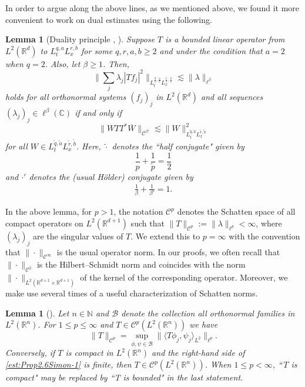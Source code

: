 \documentclass[a4paper]{amsart}
\numberwithin{equation}{section}%
\theoremstyle{plain}%
\newtheorem{lemma}[theorem]{Lemma}
\theoremstyle{definition}
\theoremstyle{remark}%
\def\C{\mathcal{C}}
\def\C{\mathcal{C}}
\newcommand{\R}{{\mathbb R}}
\newcommand{\N}{{\mathbb N}}
\begin{document}
In order to argue along the above lines, as we mentioned above, we found it more convenient to work on dual estimates using the following. 
\begin{lemma}[Duality principle \cite{FS_AJM}, \cite{BHLNS}]\label{l:duality}
Suppose $T$ is a bounded linear operator from $L^2(\mathbb{R}^d)$ to $L_t^{q,a} L_x^{r,b}$ for some $q,r,a,b \geq2$ and under the condition that $a = 2$ when $q = 2$. Also, let $\beta\geq1$.  Then, 
\[
\bigg\|\sum_j\lambda_j|Tf_j|^2 \bigg\|_{L_t^{\frac {q}{2},\frac {a}{2}}L_x^{\frac {r}{2},\frac{b}{2}}}\lesssim\|\lambda\|_{\ell^{\beta}}
\]
holds for all orthonormal systems $(f_j)_j$ in $L^2(\mathbb R^d)$ and all sequences $(\lambda_j)_j \in \ell^{\beta}(\mathbb C)$ if and only if 
\[
\|WTT^*\overline{W}\|_{\C^{\beta'}}
\lesssim 
\|W\|_{L_t^{\widetilde{q},\widetilde{a}}L_x^{\widetilde{r},\widetilde{b}}}^2
\]
for all $W\in L_t^{\widetilde{q},\widetilde{a}}L_x^{\widetilde{r},\widetilde{b}}$. Here, $\widetilde{\cdot}$ denotes the ``half conjugate" given by
\[
\frac{1}{p}+\frac{1}{\widetilde{p}}=\frac12
\]
and $\cdot'$ denotes the (usual H\"older) conjugate given by
\begin{align*}
\frac1\beta+\frac{1}{\beta'}=1.
\end{align*}
\end{lemma}
In the above lemma, for $p > 1$, the notation $\C^{p}$ denotes the Schatten space of all compact operators on $L^2(\mathbb R^{d+1})$ such that $\|T\|_{\C^{p}}:=\|\lambda\|_{\ell^{p}}<\infty$, where $(\lambda_j)_j$ are the singular values of $T$. We extend this to $p = \infty$ with the convention that $\|\cdot\|_{\C^\infty}$ is the usual operator norm. In our proofs, we often recall that $\|\cdot\|_{\C^2}$ is the Hilbert--Schmidt norm and coincides with the norm $\|\cdot\|_{L^2(\mathbb R^{d+1}\times\mathbb R^{d+1})}$ of the kernel of the corresponding operator. 
Moreover, we make use several times of a useful characterization of Schatten norms.
\begin{lemma}[{\cite[Proposition~2.6]{Simon}}]
\label{l:Simon}
Let $n \in \N$ and $\mathcal{B}$ denote the collection all orthonormal families in $L^2(\R^n)$. For $1 \leq p \leq \infty$ and $T \in \mathcal{C}^p(L^2(\R^n))$ we have
\begin{equation}\label{est:Prop2.6Simon-1}
\| T\|_{\mathcal{C}^{p}} = \sup_{\phi, \psi \in \mathcal{B}} \|\langle  T \phi_j,   \psi_j \rangle_{L^2} \|_{\ell^{p}}.
\end{equation}
Conversely, if $T$ is compact in $L^2(\R^n)$ and the right-hand side of \eqref{est:Prop2.6Simon-1} is finite, then $T \in \mathcal{C}^{p}(L^2(\R^n))$. When $1\leq p<\infty$, ``$ \, T$ is compact" may be replaced by ``T is bounded" in the last statement.
\end{lemma}
\end{document}
